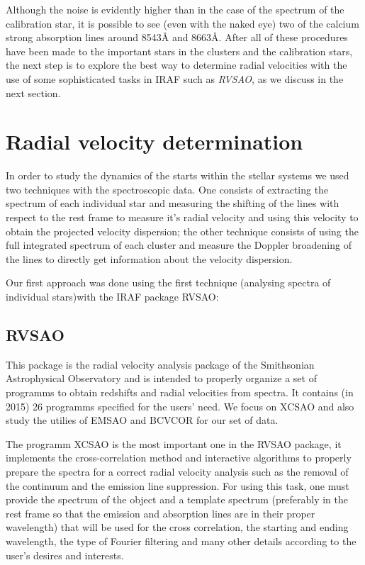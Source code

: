 Although the noise is evidently higher than in the case of the spectrum of the calibration star, it is possible to see (even with the naked eye) two of the calcium strong absorption lines around 8543\AA$ $ and 8663\AA. After all of these procedures have been made to the important stars in the clusters and the calibration stars, the next step is to explore the best way to determine radial velocities with the use of some sophisticated tasks in IRAF such as \textit{RVSAO}, as we discuss in the next section. 

\section{Radial velocity determination}

In order to study the dynamics of the starts within the stellar systems we used two techniques with the spectroscopic data. One consists of extracting the spectrum of each individual star and measuring the shifting of the lines with respect to the rest frame to measure it's radial velocity and using this velocity to obtain the projected velocity dispersion; the other technique consists of using the full integrated spectrum of each cluster and measure the Doppler broadening of the lines to directly get information about the velocity dispersion. 

Our first approach was done using the first technique (analysing spectra of individual stars)with the IRAF package RVSAO:

\subsection{RVSAO}

This package is the radial velocity analysis package of the Smithsonian Astrophysical Observatory and is intended to properly organize a set of programms to obtain redshifts and radial velocities from spectra. It contains (in 2015) 26 programms specified for the users' need. We focus on XCSAO and also study the utilies of EMSAO and BCVCOR for our set of data.

The programm XCSAO is the most important one in the RVSAO package, it implements the cross-correlation method and interactive algorithms to properly prepare the spectra for a correct radial velocity analysis such as the removal of the continuum and the emission line suppression. For using this task, one must provide the spectrum of the object and a template spectrum (preferably in the rest frame so that the emission and absorption lines are in their proper wavelength) that will be used for the cross correlation, the starting and ending wavelength, the type of Fourier filtering and many other details according to the user's desires and interests.

